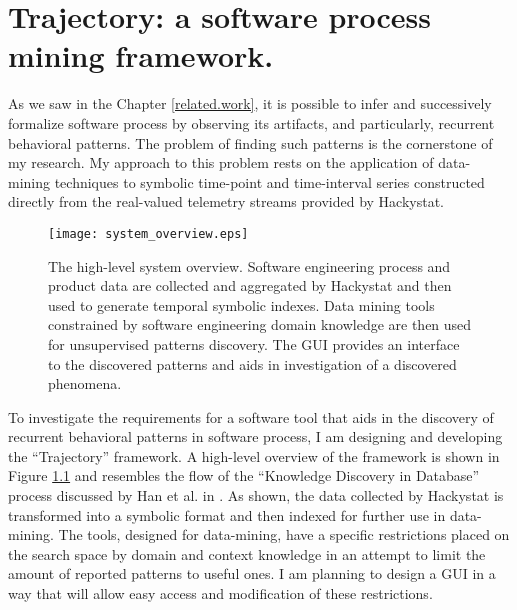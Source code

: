 \chapter{Trajectory: a software process mining framework.} \label{trajectory}
As we saw in the Chapter \ref{related.work}, it is possible to infer and successively formalize software process by observing its artifacts, and particularly, recurrent behavioral patterns. The problem of finding such patterns is the cornerstone of my research. My approach to this problem rests on the application of data-mining techniques to symbolic time-point and time-interval series constructed directly from the real-valued telemetry streams provided by Hackystat.

\begin{figure}[tbp]
   \centering
   \texttt{[image: system\_overview.eps]}
   \caption{The high-level system overview. Software engineering process and product data are collected and aggregated by Hackystat and then used to generate temporal symbolic indexes. Data mining tools constrained by software engineering domain knowledge are then used for unsupervised patterns discovery. The GUI provides an interface to the discovered patterns and aids in investigation of a discovered phenomena.}
   \label{fig:system_overview}
\end{figure}


To investigate the requirements for a software tool that aids in the discovery of recurrent behavioral patterns in software process, I am designing and developing the ``Trajectory'' framework. A high-level overview of the framework is shown in Figure \ref{fig:system_overview} and resembles the flow of the ``Knowledge Discovery in Database'' process discussed by Han et al. in \cite{citeulike:709476}. As shown, the data collected by Hackystat is transformed into a symbolic format and then indexed for further use in data-mining. The tools, designed for data-mining, have a specific restrictions placed on the search space by domain and context knowledge in an attempt to limit the amount of reported patterns to useful ones. I am planning to design a GUI in a way that will allow easy access and modification of these restrictions. 

